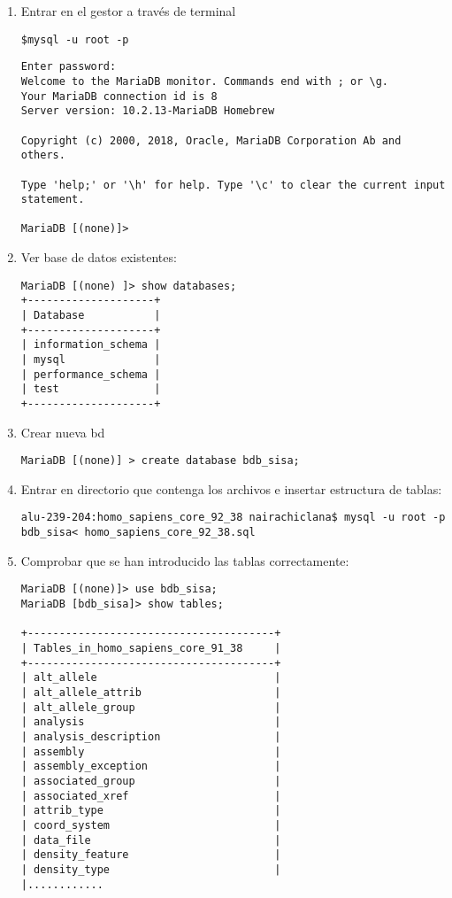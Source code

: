 \documentclass[12pt,a4paper]{article}
\begin{document}
\begin{enumerate}
\item Entrar en el gestor a través de terminal

\verb|$mysql -u root -p|

\begin{verbatim}
Enter password:
Welcome to the MariaDB monitor. Commands end with ; or \g.
Your MariaDB connection id is 8
Server version: 10.2.13-MariaDB Homebrew

Copyright (c) 2000, 2018, Oracle, MariaDB Corporation Ab and others. 

Type 'help;' or '\h' for help. Type '\c' to clear the current input statement.

MariaDB [(none)]>
\end{verbatim}

\item Ver base de datos existentes:

\begin{verbatim}
MariaDB [(none) ]> show databases;
+--------------------+
| Database           |
+--------------------+
| information_schema |
| mysql              |
| performance_schema |
| test               |
+--------------------+
\end{verbatim}

\item Crear nueva bd
\begin{verbatim}
MariaDB [(none)] > create database bdb_sisa;
\end{verbatim}


\item Entrar en directorio que contenga los archivos e insertar estructura de tablas:

\begin{verbatim}
alu-239-204:homo_sapiens_core_92_38 nairachiclana$ mysql -u root -p 
bdb_sisa< homo_sapiens_core_92_38.sql
\end{verbatim}

\item Comprobar que se han introducido las tablas correctamente: 

\begin{verbatim}
MariaDB [(none)]> use bdb_sisa;
MariaDB [bdb_sisa]> show tables;

+---------------------------------------+
| Tables_in_homo_sapiens_core_91_38     |
+---------------------------------------+
| alt_allele                            |
| alt_allele_attrib                     |
| alt_allele_group                      |
| analysis                              |
| analysis_description                  |
| assembly                              |
| assembly_exception                    |
| associated_group                      |
| associated_xref                       |
| attrib_type                           |
| coord_system                          |
| data_file                             |
| density_feature                       |
| density_type                          |
|............                                 


\end{verbatim}
\end{enumerate}
\end{document}
